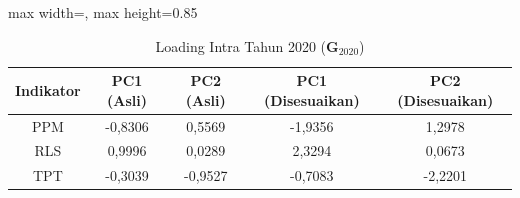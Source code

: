 \begin{table}[H]
\centering
\caption{Loading Intra Tahun 2020 ($\mathbf{G}_{2020}$)} \label{tab:sample1loading_intra_2020}
\begin{adjustbox}{max width=\textwidth, max height=0.85\textheight}
\begin{tabular}{|c|c|c|c|c|}
\hline
\textbf{Indikator} & \textbf{PC1 (Asli)} & \textbf{PC2 (Asli)} & \textbf{PC1 (Disesuaikan)} & \textbf{PC2 (Disesuaikan)} \\
\hline
PPM & -0,8306 & 0,5569 & -1,9356 & 1,2978 \\
RLS & 0,9996 & 0,0289 & 2,3294 & 0,0673 \\
TPT & -0,3039 & -0,9527 & -0,7083 & -2,2201 \\
\hline
\end{tabular}
\end{adjustbox}
\end{table}